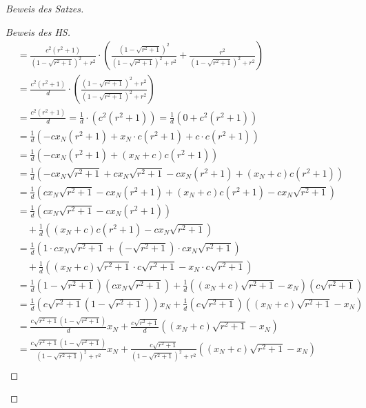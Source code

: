 \begin{proof}[Beweis des Satzes]
\begin{proof}[Beweis des HS]
\begin{align*}
            &=\frac{c^2(r^2+1)}{\left(1-\sqrt{r^2+1}\right)^2+r^2}\cdot
            \left(\frac{\left(1-\sqrt{r^2+1}\right)^2}{\left(1-\sqrt{r^2+1}\right)^2+r^2}+\frac{r^2}
            {\left(1-\sqrt{r^2+1}\right)^2+r^2}\right)\\
            &=\frac{c^2(r^2+1)}{d}\cdot\left(\frac{\left(1-\sqrt{r^2+1}\right)^2+r^2}{\left(1-\sqrt{r^2+1}\right)^2
            +r^2}\right)\\
            &=\frac{c^2(r^2+1)}{d}=\frac{1}{d}\cdot\left(c^2(r^2+1)\right)=\frac{1}{d}\left(0+c^2(r^2+1)\right)\\
            &=\frac{1}{d}\left(-cx_N\left(r^2+1\right)+x_N\cdot c\left(r^2+1\right)+c\cdot c\left(r^2+1\right)\right)\\
            &=\frac{1}{d}\left(-cx_N\left(r^2+1\right)+\left(x_N+c\right)c\left(r^2+1\right)\right)\\
            &=\frac{1}{d}\left(-cx_N\sqrt{r^2+1}+cx_N\sqrt{r^2+1}-cx_N\left(r^2+1\right)+
            \left(x_N+c\right)c\left(r^2+1\right)\right)\\
            &=\frac{1}{d}\left(cx_N\sqrt{r^2+1}-cx_N\left(r^2+1\right)+\left(x_N+c\right)c\left(r^2+1\right)
            -cx_N\sqrt{r^2+1}\right)\\
            &=\frac{1}{d}\left(cx_N\sqrt{r^2+1}-cx_N\left(r^2+1\right)\right)\\
            &\quad+\frac{1}{d}\left(\left(x_N+c\right)c\left(r^2+1\right)-cx_N\sqrt{r^2+1}\right)\\
            &=\frac{1}{d}\left(1\cdot cx_N\sqrt{r^2+1}+\left(-\sqrt{r^2+1}\right)\cdot cx_N\sqrt{r^2+1}\right)\\
            &\quad+\frac{1}{d}\left((x_N+c)\sqrt{r^2+1}\cdot c\sqrt{r^2+1}-x_N\cdot c\sqrt{r^2+1}\right)\\
            &=\frac{1}{d}\left(1-\sqrt{r^2+1}\right)\left(cx_N\sqrt{r^2+1}\right)+\frac{1}{d}\left((x_N+c)\sqrt{r^2+1}
            -x_N\right)\left(c\sqrt{r^2+1}\right)\\
            &=\frac{1}{d}\left(c\sqrt{r^2+1}\left(1-\sqrt{r^2+1}\right)\right)x_N+\frac{1}{d}\left(c\sqrt{r^2+1}\right)
            \left((x_N+c)\sqrt{r^2+1}-x_N\right)\\
            &=\frac{c\sqrt{r^2+1}\left(1-\sqrt{r^2+1}\right)}{d}x_N+ \frac{c\sqrt{r^2+1}}{d}\left((x_N+c)\sqrt{r^2+1}-x_N\right)\\
            &=\frac{c\sqrt{r^2+1}\left(1-\sqrt{r^2+1}\right)}{\left(1-\sqrt{r^2+1}\right)^2+r^2}x_N+
            \frac{c\sqrt{r^2+1}}{\left(1-\sqrt{r^2+1}\right)^2+r^2}\left((x_N+c)\sqrt{r^2+1}-x_N\right)\\

\end{align*}
\end{proof}
\end{proof}
